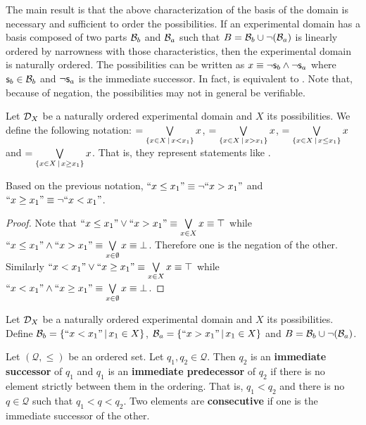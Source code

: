 The main result is that the above characterization of the basis of the domain is necessary and sufficient to order the possibilities. If an experimental domain has a basis composed of two parts $\mathcal{B}_b$ and $\mathcal{B}_a$ such that $B=\mathcal{B}_b \cup \neg(\mathcal{B}_a)$ is linearly ordered by narrowness with those characteristics, then the experimental domain is naturally ordered. The possibilities can be written as $x \equiv \neg \mathsf{s}_b \wedge \neg \mathsf{s}_a$ where $\mathsf{s}_b \in \mathcal{B}_b$ and $\neg \mathsf{s}_a$ is the immediate successor. In fact,  is equivalent to . Note that, because of negation, the possibilities may not in general be verifiable.

\begin{mathSection}
	\begin{defn}
		Let $\mathcal{D}_X$ be a naturally ordered experimental domain and $X$ its possibilities. We define the following notation:
		$=\bigvee\limits_{\{x \in X \, | \, x < x_1\}} x$, $=\bigvee\limits_{\{x \in X \, | \, x > x_1\}} x$, $=\bigvee\limits_{\{x \in X \, | \, x \leq x_1\}} x$ and $=\bigvee\limits_{\{x \in X \, | \, x \geq x_1\}} x$. That is, they represent statements like .
	\end{defn}
	\begin{coro}\label{pm-pq-notAfterIsBeforeOrOn}
		Based on the previous notation, $``x \leq x_1"\equiv \neg ``x > x_1"$ and $``x \geq x_1"\equiv \neg ``x < x_1"$.
	\end{coro}
	\begin{proof}
		Note that $``x \leq x_1" \vee ``x > x_1" \equiv \bigvee\limits_{x \in X} x \equiv \top$ while $``x \leq x_1" \wedge ``x > x_1" \equiv \bigvee\limits_{x \in \emptyset} x \equiv \bot$. Therefore one is the negation of the other. Similarly $``x < x_1" \vee ``x \geq x_1" \equiv \bigvee\limits_{x \in X} x \equiv \top$ while $``x < x_1" \wedge ``x \geq x_1" \equiv \bigvee\limits_{x \in \emptyset} x \equiv \bot$.
	\end{proof}
	\begin{defn}\label{pm-pq-defBeforeAfterBasis}
		Let $\mathcal{D}_X$ be a naturally ordered experimental domain and $X$ its possibilities. Define $\mathcal{B}_b = \{ ``x < x_1" \, | \, x_1 \in X \}$, $\mathcal{B}_a = \{ ``x > x_1" \, | \, x_1 \in X \}$ and $B = \mathcal{B}_b \cup \neg (\mathcal{B}_a)$.
	\end{defn}
	\begin{defn}
		Let $(\mathcal{Q}, \leq)$ be an ordered set. Let $q_1, q_2 \in \mathcal{Q}$. Then $q_2$ is an \textbf{immediate successor} of $q_1$ and $q_1$ is an \textbf{immediate predecessor} of $q_2$ if there is no element strictly between them in the ordering. That is, $q_1 < q_2$ and there is no $q \in \mathcal{Q}$ such that $q_1 < q < q_2$. Two elements are \textbf{consecutive} if one is the immediate successor of the other.
	\end{defn}
	

\end{mathSection}
